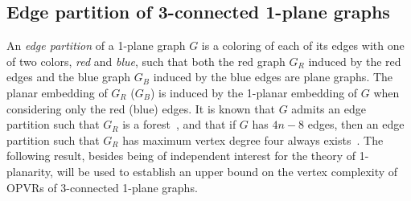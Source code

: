 \documentclass{article}
\newcommand{\opvr}{OPVR\xspace}
\begin{document}
\subsection{Edge partition of 3-connected 1-plane graphs}\label{sse:partition}

An \emph{edge partition}  of a 1-plane graph $G$ is a coloring of each of its edges with one of two colors, \emph{red} and \emph{blue}, such that both the red graph $G_R$ induced by the red edges and the blue graph $G_B$ induced by the blue edges are plane graphs. 
The planar embedding of $G_R$ ($G_B$) is induced by the 1-planar embedding of $G$ when considering only the red (blue) edges. 
It is known that $G$ admits an edge partition such that $G_R$ is a forest~\cite{DBLP:journals/dam/Ackerman14,DBLP:journals/combinatorics/CzapH13}, and that if $G$  has $4n-8$ edges, then an edge partition such that $G_R$ has maximum vertex degree four always exists~\cite{Lenhart201759}. 
The following result, besides being of independent interest for the theory of 1-planarity, will be used to establish an upper bound on the vertex complexity of {\opvr}s of 3-connected 1-plane graphs.
\end{document}
